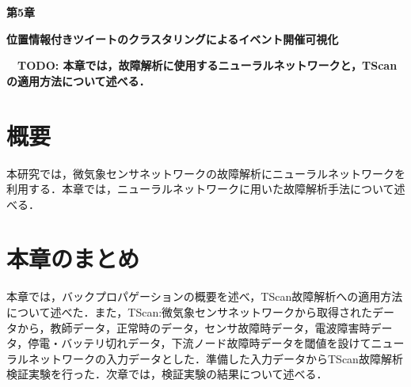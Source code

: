 \newpage
\setcounter{chapter}{5}
\setcounter{section}{0}

\begin{center}
\vspace{0.5cm}
\huge{\bf 第5章}
\par
\vspace{1cm}
\hrulefill
\par
\vspace{1cm}
\huge{\bf 位置情報付きツイートのクラスタリングによるイベント開催可視化}
\par
\vspace{0.5cm}
\hrulefill
\vspace{1cm}
\par

\begin{flushleft}
\large{{\bf　TODO: 本章では，故障解析に使用するニューラルネットワークと，TScanの適用方法について述べる．}}
\end{flushleft}
\end{center}


\newpage
\section{概要}
本研究では，微気象センサネットワークの故障解析にニューラルネットワークを利用する．本章では，ニューラルネットワークに用いた故障解析手法について述べる．

\newpage

\section{本章のまとめ}
本章では，バックプロパゲーションの概要を述べ，TScan故障解析への適用方法について述べた．また，TScan:微気象センサネットワークから取得されたデータから，教師データ，正常時のデータ，センサ故障時データ，電波障害時データ，停電・バッテリ切れデータ，下流ノード故障時データを閾値を設けてニューラルネットワークの入力データとした．準備した入力データからTScan故障解析検証実験を行った．次章では，検証実験の結果について述べる．
\newpage
